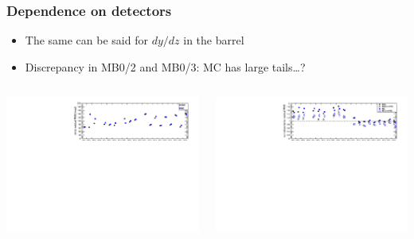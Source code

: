 \documentclass[compress]{beamer}
\begin{document}
\begin{frame}
\frametitle{Dependence on detectors}

\begin{itemize}
\item The same can be said for $dy/dz$ in the barrel
\item Discrepancy in MB0/2 and MB0/3: MC has large tails\ldots?
\end{itemize}
\begin{columns}
\includegraphics[width=\linewidth]{summarydYdZ.pdf}

\includegraphics[width=\linewidth]{summarydYdZnorm.pdf}



\end{columns}
\end{frame}
\end{document}
